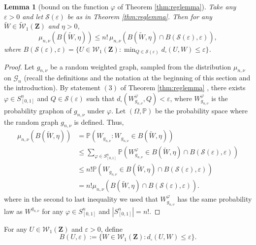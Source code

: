 \documentclass[12pt,twoside,a4paper]{article}
\newtheorem{lemma}[theorem]{Lemma}
\def\P{\mathbb{P}}
\newcommand{\Space}{\mathbf{Z}}
\newcommand{\Graphon}{\mathcal{W}_1}
\newcommand{\UGraphon}{\widetilde{\mathcal{W}}_1}
\renewcommand{\P}{\mathbb{P}}
\begin{document}
\begin{lemma}[bound on the function $\varphi$ of Theorem \ref{thm:reglemma}]\label{lem:regularityupperbound}
Take any $\varepsilon > 0$ and let $\mathcal{S}(\varepsilon)$ be as in Theorem \ref{thm:reglemma}. Then for any $\widetilde{W} \in \UGraphon(\Space)$ and $\eta > 0$,
\[
\mu_{n,\nu}(B(\widetilde{W}, \eta)) \leq n! \, \mu_{n,\nu}(B(\widetilde{W}, \eta) \cap B(\mathcal{S}(\varepsilon), \varepsilon)),
\]
where $B(\mathcal{S}(\varepsilon), \varepsilon) = \{ U \in \Graphon(\Space) : \min_{Q \in \mathcal{S}(\varepsilon)} d_\square(U, W) \leq \varepsilon \}$.
\end{lemma}
\begin{proof}
Let $g_{n,\nu}$ be a random weighted graph, sampled from the distribution $\mu_{n,\nu}$ on $\mathcal{G}_n$ (recall the definitions and the notation at the beginning of this section and the introduction).  By statement $(3)$ of Theorem \ref{thm:reglemma} , there exists $\varphi \in S^n_{[0,1]}$ and $Q \in \mathcal{S}(\varepsilon)$ such that $d_\square(W_{g_{n,\nu}}^\varphi, Q) < \varepsilon$, where $W_{g_{n,\nu}}^\varphi$ is the probability graphon of $g_{n,\nu}$ under $\varphi.$ Let $(\Omega,\P)$ be the probability space where the random graph $g_{n,\nu}$ is defined. Thus,
\[
\begin{split}
    \mu_{n,\nu}(B(\widetilde{W}, \eta)) &= \mathbb{P}(W_{g_{n,\nu}}:W_{g_{n,\nu}} \in B(\widetilde{W}, \eta))\\
&\leq \sum_{\varphi \in S^n_{[0,1]}} \mathbb{P}(W_{g_{n,\nu}}^\varphi \in B(\widetilde{W}, \eta) \cap B(\mathcal{S}(\varepsilon), \varepsilon))\\
&\leq n!\mathbb{P}(W_{g_{n,\nu}} \in B(\widetilde{W}, \eta) \cap B(\mathcal{S}(\varepsilon), \varepsilon))\\
&=  n!\mu_{n,\nu}(B(\widetilde{W}, \eta) \cap B(\mathcal{S}(\varepsilon), \varepsilon)).
\end{split}
\]
where in the second to last inequality we used that $W_{g_{n,\nu}}^\varphi$ has the same probability law as $W^{g_{n,\nu}}$ for any $\varphi \in S^n_{[0,1]}$ and $| S^n_{[0,1]}| = n!$.
\end{proof}

For any $U \in \Graphon(\Space)$ and $\varepsilon > 0$, define
\[
B(U, \varepsilon) := \{ W \in \Graphon(\Space) : d_\square(U, W) \leq \varepsilon \}.
\]
\end{document}
